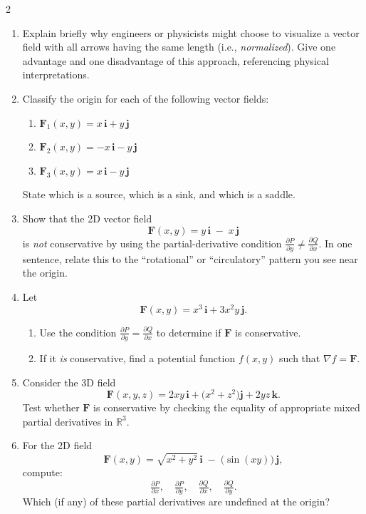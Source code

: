 \begin{multicols}{2}
\begin{enumerate}
\item 
Explain briefly why engineers or physicists might choose to visualize a vector field with all arrows having the same length (i.e., \emph{normalized}). Give one advantage and one disadvantage of this approach, referencing physical interpretations.

\item \enspace
Classify the origin for each of the following vector fields:
\begin{enumerate}
\item $\mathbf{F}_1(x,y) = x\,\mathbf{i} + y\,\mathbf{j}$
\item $\mathbf{F}_2(x,y) = -x\,\mathbf{i} - y\,\mathbf{j}$
\item $\mathbf{F}_3(x,y) = x\,\mathbf{i} - y\,\mathbf{j}$
\end{enumerate}
State which is a source, which is a sink, and which is a saddle.

\item \enspace
Show that the 2D vector field
\[
\mathbf{F}(x,y) = y\,\mathbf{i} \;-\; x\,\mathbf{j}
\]
is \emph{not} conservative by using the partial-derivative condition
\(\tfrac{\partial P}{\partial y} \neq \tfrac{\partial Q}{\partial x}\).
In one sentence, relate this to the ``rotational'' or ``circulatory'' pattern you see near the origin.

\item \enspace
Let
\[
\mathbf{F}(x,y) = x^3\,\mathbf{i} + 3x^2y\,\mathbf{j}.
\]
\begin{enumerate}
\item Use the condition \(\tfrac{\partial P}{\partial y} = \tfrac{\partial Q}{\partial x}\) to determine if \(\mathbf{F}\) is conservative.
\item If it \emph{is} conservative, find a potential function \(f(x,y)\) such that \(\nabla f = \mathbf{F}\).
\end{enumerate}

\item \enspace
Consider the 3D field
\[
\mathbf{F}(x,y,z) = 2xy\,\mathbf{i} + \bigl(x^2 + z^2\bigr)\mathbf{j} + 2yz\,\mathbf{k}.
\]
Test whether \(\mathbf{F}\) is conservative by checking the equality of appropriate mixed partial derivatives in \(\mathbb{R}^3\).

\item \enspace
For the 2D field
\[
\mathbf{F}(x,y) = \sqrt{x^2 + y^2}\,\mathbf{i}
\;-\;
\bigl(\sin(xy)\bigr)\,\mathbf{j},
\]
compute:
\[
\tfrac{\partial P}{\partial x}, \quad \tfrac{\partial P}{\partial y}, \quad
\tfrac{\partial Q}{\partial x}, \quad \tfrac{\partial Q}{\partial y}.
\]
Which (if any) of these partial derivatives are undefined at the origin?


\end{enumerate}
\end{multicols}
